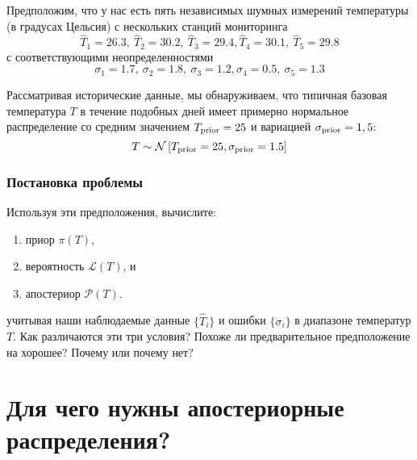 \documentclass[12pt, titlepage]{article}
\newcommand{\Normal}[2]{\ensuremath{\mathcal{N}\left[{#1}, {#2} \right]}} %
\newcommand{\likelihood}{\ensuremath{\mathcal{L}}}
\newcommand{\prior}{\ensuremath{\pi}}
\newcommand{\posterior}{\ensuremath{\mathcal{P}}}
\begin{document}
Предположим, что у нас есть пять независимых шумных измерений температуры (в градусах Цельсия) с нескольких станций мониторинга
\begin{equation*}
    \hat{T}_1 = 26.3, \: \hat{T}_2 = 30.2, \: \hat{T}_3 = 29.4, 
    \hat{T}_4 = 30.1, \: \hat{T}_5 = 29.8
\end{equation*}
с соответствующими неопределенностями
\begin{equation*}
    \sigma_1 = 1.7, \: \sigma_2 = 1.8, \: \sigma_3 = 1.2, 
    \sigma_4 = 0.5, \: \sigma_5 = 1.3
\end{equation*}

Рассматривая исторические данные, мы обнаруживаем, что типичная базовая температура $T$ в течение подобных дней имеет примерно нормальное распределение со средним значением $T_{\rm prior}=25$ и вариацией $\sigma_{\rm prior} = 1,5$:
\begin{equation*}
    T \sim \Normal{T_{\rm prior}=25}{\sigma_{\rm prior}=1.5}
\end{equation*}

\subsubsection*{Постановка проблемы}

Используя эти предположения, вычислите:
\begin{enumerate}
	\item приор $\prior(T)$,
	\item вероятность $\likelihood(T)$, и
	\item апостериор $\posterior(T)$.
\end{enumerate}
учитывая наши наблюдаемые данные $\{ \hat{T}_i \}$ и ошибки $\{ \sigma_i \}$
в диапазоне температур $T$. Как различаются эти три условия?
Похоже ли предварительное предположение на хорошее? Почему или почему нет?

\section{Для чего нужны апостериорные распределения?} \label{sec:what}
\end{document}
